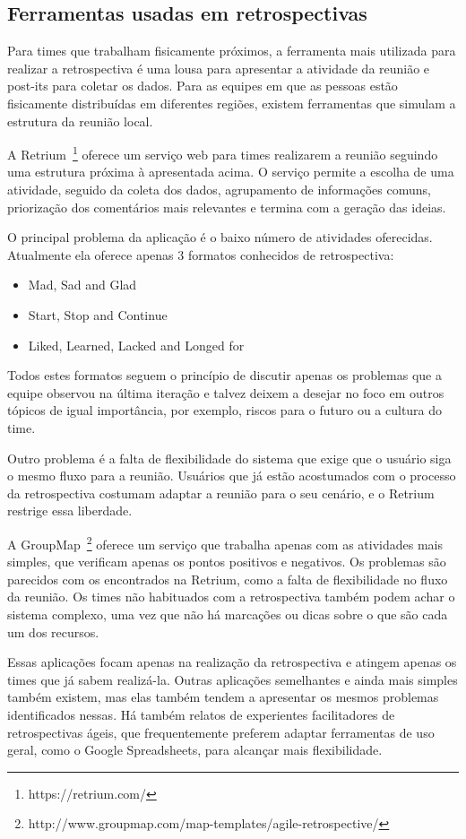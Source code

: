 \subsection{Ferramentas usadas em retrospectivas}

Para times que trabalham fisicamente próximos, a ferramenta mais utilizada para realizar a retrospectiva é uma lousa para apresentar a atividade da reunião e post-its para coletar os dados. Para as equipes em que as pessoas estão fisicamente distribuídas em diferentes regiões, existem ferramentas que simulam a estrutura da reunião local.

A Retrium~\footnote{https://retrium.com/} oferece um serviço web para times realizarem a reunião seguindo uma estrutura próxima à apresentada acima. O serviço permite a escolha de uma atividade, seguido da coleta dos dados, agrupamento de informações comuns, priorização dos comentários mais relevantes e termina com a geração das ideias.

O principal problema da aplicação é o baixo número de atividades oferecidas. Atualmente ela oferece apenas 3 formatos conhecidos de retrospectiva:

\begin{itemize}
	\item Mad, Sad and Glad
	\item Start, Stop and Continue
	\item Liked, Learned, Lacked and Longed for
\end{itemize}

Todos estes formatos seguem o princípio de discutir apenas os problemas que a equipe observou na última iteração e talvez deixem a desejar no foco em outros tópicos de igual importância, por exemplo, riscos para o futuro ou a cultura do time.

Outro problema é a falta de flexibilidade do sistema que exige que o usuário siga o mesmo fluxo para a reunião. Usuários que já estão acostumados com o processo da retrospectiva costumam adaptar a reunião para o seu cenário, e o Retrium restrige essa liberdade.

A GroupMap~\footnote{http://www.groupmap.com/map-templates/agile-retrospective/} oferece um serviço que trabalha apenas com as atividades mais simples, que verificam apenas os pontos positivos e negativos. Os problemas são parecidos com os encontrados na Retrium, como a falta de flexibilidade no fluxo da reunião. Os times não habituados com a retrospectiva também podem achar o sistema complexo, uma vez que não há marcações ou dicas sobre o que são cada um dos recursos.

Essas aplicações focam apenas na realização da retrospectiva e atingem apenas os times que já sabem realizá-la. Outras aplicações semelhantes e ainda mais simples também existem, mas elas também tendem a apresentar os mesmos problemas identificados nessas. Há também relatos de experientes facilitadores de retrospectivas ágeis, que frequentemente preferem adaptar ferramentas de uso geral, como o Google Spreadsheets, para alcançar mais flexibilidade.
